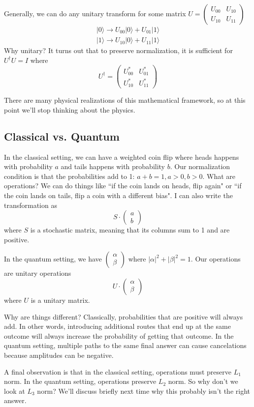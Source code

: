 Generally, we can do any unitary transform for some matrix $U = \begin{pmatrix} U_{00} & U_{10} \\ U_{10} & U_{11} \end{pmatrix}$
\begin{align*}
|0 \rangle \rightarrow U_{00} |0 \rangle + U_{01} | 1\rangle\\
|1 \rangle \rightarrow U_{10} |0\rangle + U_{11} | 1\rangle
\end{align*}
Why unitary? It turns out that to preserve normalization, it is sufficient for $U^\dagger U = I$ where
\[ U^\dagger = \begin{pmatrix} U_{00}^* & U_{01}^* \\ U_{10}^* & U_{11}^* \end{pmatrix} \]

There are many physical realizations of this mathematical framework, so at this point we'll stop thinking about the physics. 

\subsection{Classical vs. Quantum}

In the classical setting, we can have a weighted coin flip where heads happens with probability $a$ and tails happens with probability $b$. Our normalization condition is that the probabilities add to 1: $a+b =1,a>0,b>0$. What are operations? We can do things like ``if the coin lands on heads, flip again" or ``if the coin lands on tails, flip a coin with a different bias". I can also write the transformation as
\[ S \cdot \begin{pmatrix} a \\ b \end{pmatrix} \]
where $S$ is a stochastic matrix, meaning that its columns sum to 1 and are positive.

In the quantum setting, we have $\begin{pmatrix} \alpha \\ \beta \end{pmatrix}$ where $|\alpha|^2 + |\beta|^2 = 1$. Our operations are unitary operations
\[ U \cdot \begin{pmatrix}  \alpha \\ \beta \end{pmatrix} \]
where $U$ is a unitary matrix. 

Why are things different? Classically, probabilities that are positive will always add. In other words, introducing additional routes that end up at the same outcome will always increase the probability of getting that outcome. In the quantum setting, multiple paths to the same final answer can cause cancelations because amplitudes can be negative.

A final observation is that in the classical setting, operations must preserve $L_1$ norm. In the quantum setting, operations preserve $L_2$ norm. So why don't we look at $L_3$ norm? We'll discuss briefly next time why this probably isn't the right answer.



